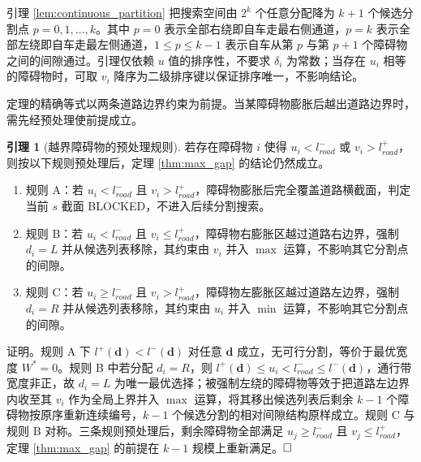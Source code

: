 \documentclass[a4paper,11pt]{ctexart}
\theoremstyle{definition}
\newtheorem{lemma}{引理}[section]
\begin{document}
引理 \ref{lem:continuous_partition} 把搜索空间由 $2^k$ 个任意分配降为 $k+1$ 个候选分割点 $p = 0, 1, \ldots, k$。其中 $p=0$ 表示全部右绕即自车走最右侧通道，$p=k$ 表示全部左绕即自车走最左侧通道，$1 \leq p \leq k-1$ 表示自车从第 $p$ 与第 $p+1$ 个障碍物之间的间隙通过。引理仅依赖 $u$ 值的排序性，不要求 $\delta_i$ 为常数；当存在 $u_i$ 相等的障碍物时，可取 $v_i$ 降序为二级排序键以保证排序唯一，不影响结论。

定理的精确等式以两条道路边界约束为前提。当某障碍物膨胀后越出道路边界时，需先经预处理使前提成立。

\begin{lemma}[越界障碍物的预处理规则]
\label{lem:boundary_trim}
若存在障碍物 $i$ 使得 $u_i < l_{road}^{-}$ 或 $v_i > l_{road}^{+}$，则按以下规则预处理后，定理 \ref{thm:max_gap} 的结论仍然成立。
\begin{enumerate}
    \item 规则 A：若 $u_i < l_{road}^{-}$ 且 $v_i > l_{road}^{+}$，障碍物膨胀后完全覆盖道路横截面，判定当前 $s$ 截面 BLOCKED，不进入后续分割搜索。
    \item 规则 B：若 $u_i < l_{road}^{-}$ 且 $v_i \leq l_{road}^{+}$，障碍物右膨胀区越过道路右边界，强制 $d_i = L$ 并从候选列表移除，其约束由 $v_i$ 并入 $\max$ 运算，不影响其它分割点的间隙。
    \item 规则 C：若 $u_i \geq l_{road}^{-}$ 且 $v_i > l_{road}^{+}$，障碍物左膨胀区越过道路左边界，强制 $d_i = R$ 并从候选列表移除，其约束由 $u_i$ 并入 $\min$ 运算，不影响其它分割点的间隙。
\end{enumerate}
\end{lemma}

证明。规则 A 下 $l^{+}(\mathbf{d}) < l^{-}(\mathbf{d})$ 对任意 $\mathbf{d}$ 成立，无可行分割，等价于最优宽度 $W^{*}=0$。规则 B 中若分配 $d_i = R$，则 $l^{+}(\mathbf{d}) \leq u_i < l_{road}^{-} \leq l^{-}(\mathbf{d})$，通行带宽度非正，故 $d_i = L$ 为唯一最优选择；被强制左绕的障碍物等效于把道路左边界内收至其 $v_i$ 作为全局上界并入 $\max$ 运算，将其移出候选列表后剩余 $k-1$ 个障碍物按原序重新连续编号，$k-1$ 个候选分割的相对间隙结构原样成立。规则 C 与规则 B 对称。三条规则预处理后，剩余障碍物全部满足 $u_j \geq l_{road}^{-}$ 且 $v_j \leq l_{road}^{+}$，定理 \ref{thm:max_gap} 的前提在 $k-1$ 规模上重新满足。$\hfill\Box$
\end{document}
